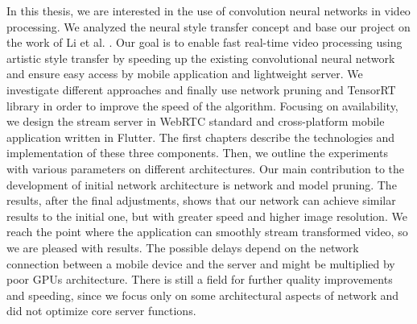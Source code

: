 \documentclass[../Main.tex]{subfiles}
\begin{document}
In this thesis, we are interested in the use of convolution neural networks in video processing. We analyzed the neural style transfer concept and base our project on the work of Li et al. \cite{Li2018}.
Our goal is to enable fast real-time video processing using artistic style transfer by speeding up the existing convolutional neural network and ensure easy access by mobile application and lightweight server.
We investigate different approaches and finally use network pruning and TensorRT library in order to improve the speed of the algorithm. Focusing on availability, we design the stream server in WebRTC standard and cross-platform mobile application written in Flutter. The first chapters describe the technologies and implementation of these three components. Then, we outline the experiments with various parameters on different architectures. Our main contribution to the development of initial network architecture \cite{Li2018} is network and model pruning.
The results, after the final adjustments, shows that our network can achieve similar results to the initial one, but with greater speed and higher image resolution. We reach the point where the application can smoothly stream transformed video, so we are pleased with results. The possible delays depend on the network connection between a mobile device and the server and might be multiplied by poor GPUs architecture. There is still a field for further quality improvements and speeding, since we focus only on some architectural aspects of network and did not optimize core server functions.

\par{} %


\biblio %
\end{document}
